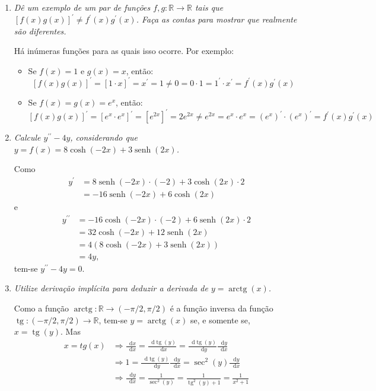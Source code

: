 \documentclass[12pt,a4paper]{article}
\newcommand*\diff{\mathop{}\!\mathrm{d}}
\newcommand*\senh{\operatorname{senh}}
\newcommand*\tg{\operatorname{tg}}
\newcommand*\arctg{\operatorname{arctg}}
\begin{document}
\begin{enumerate}
\item \textit{Dê um exemplo de um par de funções $f, g: \mathbb{R} \to \mathbb{R}$ tais que $\left[f(x)g(x)\right]^\prime \neq f^\prime(x)g^\prime(x)$. Faça as contas para mostrar que realmente são diferentes.}

Há inúmeras funções para as quais isso ocorre. Por exemplo:
\begin{itemize}
\item Se $f(x) = 1$ e $g(x) = x$, então:
\[
\left[f(x)g(x)\right]^\prime
= \left[1 \cdot x\right]^\prime
= x^\prime
= 1
\neq 0
= 0 \cdot 1
= 1^\prime \cdot x^\prime
= f^\prime(x)g^\prime(x)
\]
\item Se $f(x) = g(x) = e^x$, então:
\[
\left[f(x)g(x)\right]^\prime
= \left[e^x \cdot e^x\right]^\prime
= \left[e^{2x}\right]^\prime
= 2e^{2x}
\neq e^{2x}
= e^x \cdot e^x
= (e^x)^\prime \cdot (e^x)^\prime
= f^\prime(x)g^\prime(x)
\]
\end{itemize}

\item \textit{Calcule $y^{\prime\prime} - 4y$, considerando que $y=f(x) = 8\cosh(-2x) + 3\senh(2x)$.}

Como
\begin{align*}
y^\prime
& = 8 \senh(-2x) \cdot(-2) + 3\cosh(2x) \cdot 2 \\
& = -16 \senh(-2x) + 6\cosh(2x)
\end{align*}
e
\begin{align*}
y^{\prime\prime}
& = -16 \cosh(-2x) \cdot (-2) + 6\senh(2x) \cdot 2 \\
& = 32 \cosh(-2x) + 12\senh(2x) \\
& = 4(8\cosh(-2x) + 3\senh(2x)) \\
& = 4y,
\end{align*}
tem-se $y^{\prime\prime} - 4y = 0$.

\item \textit{Utilize derivação implícita para deduzir a derivada de $y = \arctg(x)$.}

Como a função $\arctg: \mathbb{R} \to (-\pi/2,\pi/2)$ é a função inversa da função $\tg: (-\pi/2,\pi/2) \to \mathbb{R}$, tem-se $y = \arctg(x)$ se, e somente se, $x = \tg(y)$. Mas
\begin{align*}
x = tg(x)
& \Rightarrow \frac{\diff{x}}{\diff{x}}
= \frac{\diff{\tg}(y)}{\diff{x}}
= \frac{\diff{\tg}(y)}{\diff{y}} \frac{\diff{y}}{\diff{x}} \\
& \Rightarrow 1
= \frac{\diff{\tg}(y)}{\diff{y}} \frac{\diff{y}}{\diff{x}}
= \sec^2(y) \frac{\diff{y}}{\diff{x}} \\
& \Rightarrow \frac{\diff{y}}{\diff{x}}
= \frac{1}{ \sec^2(y) }
= \frac{1}{ \tg^2(y) + 1 }
= \frac{1}{ x^2 + 1 }
\end{align*}


\end{enumerate}
\end{document}
